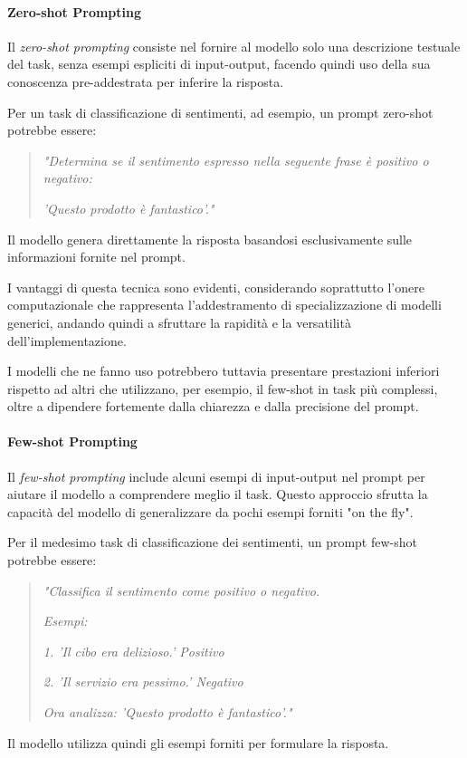 \documentclass[../main.tex]{subfiles}
\begin{document}
\paragraph{Zero-shot Prompting}

Il \textit{zero-shot prompting} consiste nel fornire al modello solo una descrizione testuale del task, senza esempi espliciti di input-output, facendo quindi uso della sua conoscenza pre-addestrata per inferire la risposta.

Per un task di classificazione di sentimenti, ad esempio, un prompt zero-shot potrebbe essere:

\begin{quote}
    \textit{"Determina se il sentimento espresso nella seguente frase è positivo o negativo: }
    
    \textit{'Questo prodotto è fantastico'."}
\end{quote}
Il modello genera direttamente la risposta basandosi esclusivamente sulle informazioni fornite nel prompt.

I vantaggi di questa tecnica sono evidenti, considerando soprattutto l'onere computazionale che rappresenta l'addestramento di specializzazione di modelli generici, andando quindi a sfruttare la rapidità e la versatilità dell'implementazione.  

I modelli che ne fanno uso potrebbero tuttavia presentare prestazioni inferiori rispetto ad altri che utilizzano, per esempio, il few-shot in task più complessi, oltre a dipendere fortemente dalla chiarezza e dalla precisione del prompt.

\paragraph{Few-shot Prompting}

Il \textit{few-shot prompting} include alcuni esempi di input-output nel prompt per aiutare il modello a comprendere meglio il task. Questo approccio sfrutta la capacità del modello di generalizzare da pochi esempi forniti "on the fly".

Per il medesimo task di classificazione dei sentimenti, un prompt few-shot potrebbe essere:
\begin{quote}
    \textit{"Classifica il sentimento come positivo o negativo.}  
    
    \textit{Esempi:}  
    
    \textit{1. 'Il cibo era delizioso.' \textrightarrow Positivo}  
    
    \textit{2. 'Il servizio era pessimo.' \textrightarrow Negativo}  
    
    \textit{Ora analizza: 'Questo prodotto è fantastico'."}
\end{quote}
Il modello utilizza quindi gli esempi forniti per formulare la risposta.
\end{document}
